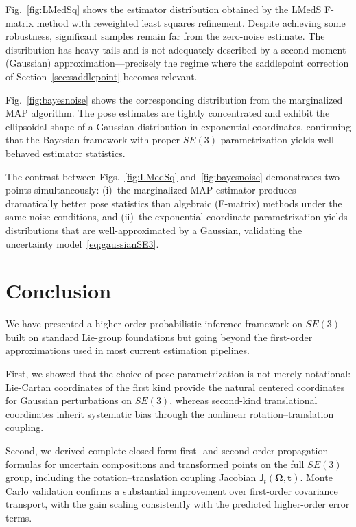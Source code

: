 \documentclass[journal]{IEEEtran}
\newcommand{\bfOmega}{\boldsymbol{\Omega}}
\begin{document}
Fig.~\ref{fig:LMedSq} shows the estimator distribution obtained 
by the LMedS F-matrix method with reweighted least squares 
refinement. Despite achieving some robustness, significant 
samples remain far from the zero-noise estimate. The 
distribution has heavy tails and is not adequately described 
by a second-moment (Gaussian) approximation---precisely the 
regime where the saddlepoint correction 
of Section~\ref{sec:saddlepoint} becomes relevant.

Fig.~\ref{fig:bayesnoise} shows the corresponding distribution 
from the marginalized MAP algorithm. The pose estimates are 
tightly concentrated and exhibit the ellipsoidal shape of a 
Gaussian distribution in exponential coordinates, confirming 
that the Bayesian framework with proper $SE(3)$ 
parametrization yields well-behaved estimator statistics.

The contrast between Figs.~\ref{fig:LMedSq} 
and~\ref{fig:bayesnoise} demonstrates two points simultaneously:
(i)~the marginalized MAP estimator produces dramatically better 
pose statistics than algebraic (F-matrix) methods under the 
same noise conditions, and (ii)~the exponential coordinate 
parametrization yields distributions that are well-approximated 
by a Gaussian, validating the uncertainty 
model~\eqref{eq:gaussianSE3}.

\section{Conclusion}
\label{sec:conclusion}

We have presented a higher-order probabilistic inference
framework on $SE(3)$ built on standard Lie-group
foundations but going beyond the first-order approximations
used in most current estimation pipelines.

First, we showed that the choice of pose parametrization is
not merely notational: Lie-Cartan coordinates of the first kind
provide the natural centered coordinates for Gaussian
perturbations on $SE(3)$, whereas second-kind translational
coordinates inherit systematic bias through the nonlinear
rotation--translation coupling.

Second, we derived complete closed-form first- and
second-order propagation formulas for uncertain compositions
and transformed points on the full $SE(3)$ group, including
the rotation--translation coupling Jacobian
$\mathsf{J}_t(\bfOmega,\mathbf{t})$. Monte Carlo validation
confirms a substantial improvement over first-order covariance
transport, with the gain scaling consistently with the predicted
higher-order error terms.
\end{document}
